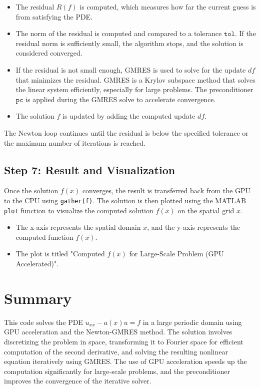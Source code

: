 \documentclass{article}
\begin{document}
\begin{itemize}
    \item The residual \( R(f) \) is computed, which measures how far the current guess is from satisfying the PDE.
    \item The norm of the residual is computed and compared to a tolerance \( \texttt{tol} \). If the residual norm is sufficiently small, the algorithm stops, and the solution is considered converged.
    \item If the residual is not small enough, GMRES is used to solve for the update \( df \) that minimizes the residual. GMRES is a Krylov subspace method that solves the linear system efficiently, especially for large problems. The preconditioner \( \texttt{pc} \) is applied during the GMRES solve to accelerate convergence.
    \item The solution \( f \) is updated by adding the computed update \( df \).
\end{itemize}

The Newton loop continues until the residual is below the specified tolerance or the maximum number of iterations is reached.

\subsection*{Step 7: Result and Visualization}

Once the solution \( f(x) \) converges, the result is transferred back from the GPU to the CPU using \texttt{gather(f)}. The solution is then plotted using the MATLAB \texttt{plot} function to visualize the computed solution \( f(x) \) on the spatial grid \( x \).

\begin{itemize}
    \item The x-axis represents the spatial domain \( x \), and the y-axis represents the computed function \( f(x) \).
    \item The plot is titled "Computed \( f(x) \) for Large-Scale Problem (GPU Accelerated)".
\end{itemize}

\section*{Summary}

This code solves the PDE \( u_{xx} - a(x) u = f \) in a large periodic domain using GPU acceleration and the Newton-GMRES method. The solution involves discretizing the problem in space, transforming it to Fourier space for efficient computation of the second derivative, and solving the resulting nonlinear equation iteratively using GMRES. The use of GPU acceleration speeds up the computation significantly for large-scale problems, and the preconditioner improves the convergence of the iterative solver.
\end{document}
